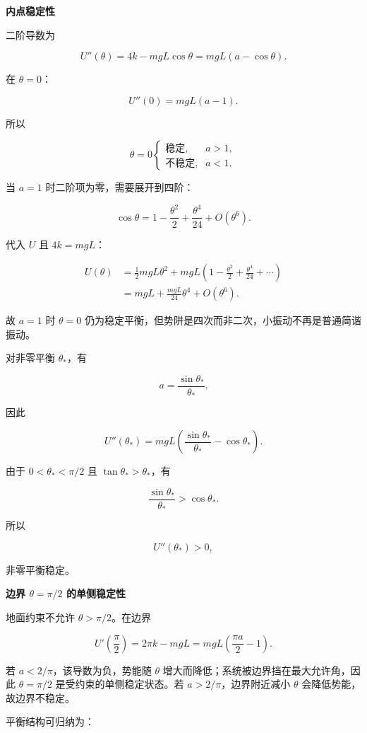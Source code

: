 \documentclass[12pt,a4paper,UTF8]{ctexart}
\begin{document}
\textbf{内点稳定性}

二阶导数为

\[U''(\theta)=4k-mgL\cos\theta
=mgL(a-\cos\theta).\]

在 \(\theta=0\)：

\[U''(0)=mgL(a-1).\]

所以

\[\boxed{
\theta=0\begin{cases}
\text{稳定},&a>1,\\
\text{不稳定},&a<1.
\end{cases}
}\]

当 \(a=1\) 时二阶项为零，需要展开到四阶：

\[\cos\theta=1-\frac{\theta^2}{2}+\frac{\theta^4}{24}+O(\theta^6).\]

代入 \(U\) 且 \(4k=mgL\)：

\[\begin{aligned}
U(\theta)
&=\frac12mgL\theta^2+mgL\left(1-\frac{\theta^2}{2}+\frac{\theta^4}{24}+\cdots\right)\\
&=mgL+\frac{mgL}{24}\theta^4+O(\theta^6).
\end{aligned}\]

故 \(a=1\) 时 \(\theta=0\)
仍为稳定平衡，但势阱是四次而非二次，小振动不再是普通简谐振动。

对非零平衡 \(\theta_*\)，有

\[a=\frac{\sin\theta_*}{\theta_*}.\]

因此

\[U''(\theta_*)=mgL\left(\frac{\sin\theta_*}{\theta_*}-\cos\theta_*\right).\]

由于 \(0<\theta_*<\pi/2\) 且 \(\tan\theta_*>\theta_*\)，有

\[\frac{\sin\theta_*}{\theta_*}>\cos\theta_*.\]

所以

\[\boxed{U''(\theta_*)>0},\]

非零平衡稳定。

\textbf{边界 \(\theta=\pi/2\) 的单侧稳定性}

地面约束不允许 \(\theta>\pi/2\)。在边界

\[U'\left(\frac\pi2\right)=2\pi k-mgL
=mgL\left(\frac{\pi a}{2}-1\right).\]

若 \(a<2/\pi\)，该导数为负，势能随 \(\theta\)
增大而降低；系统被边界挡在最大允许角，因此 \(\theta=\pi/2\)
是受约束的单侧稳定状态。若 \(a>2/\pi\)，边界附近减小 \(\theta\)
会降低势能，故边界不稳定。

平衡结构可归纳为：
\end{document}
